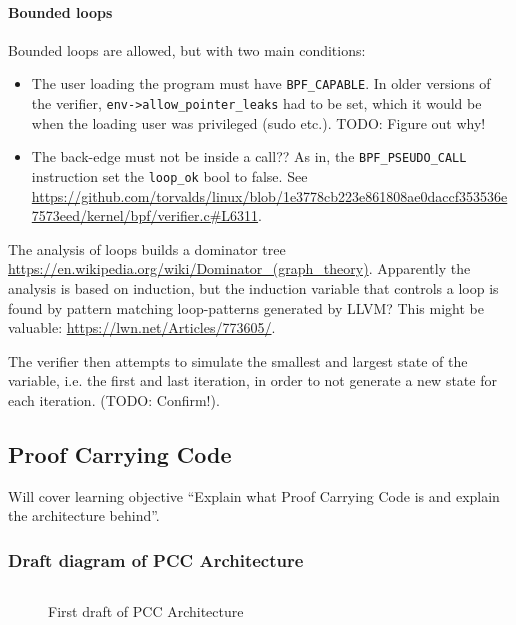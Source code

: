 \paragraph{Bounded loops}
Bounded loops are allowed, but with two main conditions:
\begin{itemize}
\item The user loading the program must have \texttt{BPF\_CAPABLE}. In older versions of the verifier, \texttt{env->allow\_pointer\_leaks} had to be set, which it would be when the loading user was privileged (sudo etc.).
  TODO: Figure out why!
  

\item The back-edge must not be inside a call?? As in, the \texttt{BPF\_PSEUDO\_CALL} instruction set the \texttt{loop\_ok} bool to false. 
See \url{ https://github.com/torvalds/linux/blob/1e3778cb223e861808ae0daccf353536e7573eed/kernel/bpf/verifier.c#L6311}.
\end{itemize}

The analysis of loops builds a dominator tree \url{https://en.wikipedia.org/wiki/Dominator_(graph_theory)}.
Apparently the analysis is based on induction, but the induction variable that controls a loop is found by pattern matching loop-patterns generated by LLVM?
This might be valuable: \url{https://lwn.net/Articles/773605/}.

The verifier then attempts to simulate the smallest and largest state of the variable, i.e. the first and last iteration, in order to not generate a new state for each iteration. (TODO: Confirm!).


\subsection{Proof Carrying Code}
\label{subsec:proof_carrying_code}

Will cover learning objective ``Explain what Proof Carrying Code is and explain the architecture behind''.



\subsubsection*{Draft diagram of PCC Architecture}

\begin{figure}[htbp!]
  \centering
\inputminted{text}{figures/pcc-architecture.txt}
  \caption{First draft of PCC Architecture}
  \label{fig:pcc-architecture}
\end{figure}





